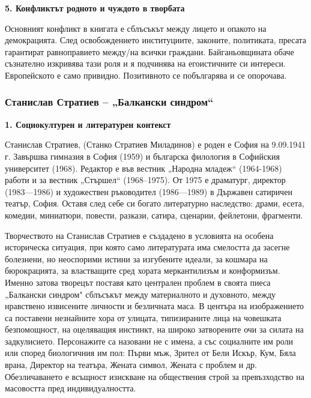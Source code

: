 \documentclass[12pt,a4paper]{article}
\begin{document}
\textbf{5. Конфликтът родното и чуждото в творбата}
\vspace{0.1cm}
  
\indent Основният конфликт в книгата е сблъсъкът между лицето и опакото на демокрацията. След освобождението институциите, законите, политиката, пресата гарантират равноправието между/на всички граждани. Байганьовщината обаче съзнателно изкривява тази роля и я подчинява на егоистичните си интереси. Европейското е само привидно. Позитивното се побългарява и се опорочава.
\newpage

\subsubsection{\colorbox{green!40}{Станислав Стратиев – „Балкански синдром“}}
\textbf{1. Социокултурен и литературен контекст}
\vspace{0.1cm}
 
\indent Станислав Стратиев, (Станко Стратиев Миладинов) е роден е София на 9.09.1941 г. Завършва гимназия в София (1959) и българска филология в Софийския университет (1968). Редактор е във вестник „Народна младеж“ (1964-1968) работи и за вестник „Стършел“ (1968–1975). От 1975 е драматург, директор (1983—1986) и художествен ръководител (1986—1989) в Държавен сатиричен театър, София. Оставя след себе си богато литературно наследство: драми, есета, комедии, миниатюри, повести, разкази, сатира, сценарии, фейлетони, фрагменти.
\vspace{0.1cm}
 
\indent Творчеството на Станислав Стратиев е създадено в условията на особена историческа ситуация, при която само литературата има смелостта да засегне болезнени, но неоспорими истини за изгубените идеали, за кошмара на бюрокрацията, за властващите сред хората меркантилизъм и конформизъм. Именно затова творецът поставя като централен проблем в своята пиеса „Балкански синдром" сблъсъкът между материалното и духовното, между нравствено извисените личности и безличната маса. В центъра на изображението са поставени незнайните хора от улицата, типизираните лица на човешката безпомощност, на оцеляващия инстинкт, на широко затворените очи за силата на задкулисието. Персонажите са назовани не с имена, а със социалните им роли или според биологичния им пол: Първи мъж, Зрител от Бели Искър, Кум, Бяла врана, Директор на театъра, Жената символ, Жената с проблем и др. Обезличаването е всъщност изискване на обществения строй за превъзходство на масовостта пред индивидуалността.
\vspace{0.1cm}
 
\end{document}
